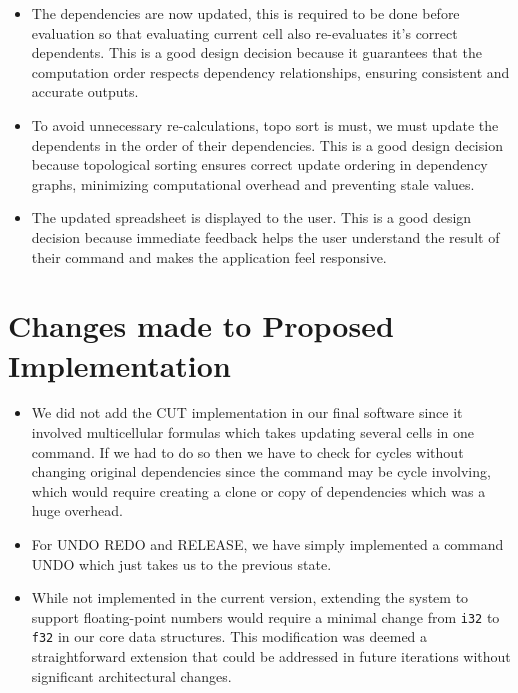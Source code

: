 \documentclass[10pt,a4paper]{article}  %
\begin{document}
\begin{enumerate}
\begin{itemize}
\begin{itemize}
            \item The dependencies are now updated, this is required to be done before evaluation so that evaluating current cell also re-evaluates it's correct dependents.  
            This is a good design decision because it guarantees that the computation order respects dependency relationships, ensuring consistent and accurate outputs.

            \item To avoid unnecessary re-calculations, topo sort is must, we must update the dependents in the order of their dependencies.  
            This is a good design decision because topological sorting ensures correct update ordering in dependency graphs, minimizing computational overhead and preventing stale values.

            \item The updated spreadsheet is displayed to the user.  
            This is a good design decision because immediate feedback helps the user understand the result of their command and makes the application feel responsive.
        \end{itemize}
    \end{itemize}
\end{enumerate}

\section{Changes made to Proposed Implementation}
\begin{itemize}
    \item We did not add the CUT implementation in our final software since it involved multicellular formulas which takes updating several cells in one command. If we had to do so then we have to check for cycles without changing original dependencies since the command may be cycle involving, which would require creating a clone or copy of dependencies which was a huge overhead.
    \item For UNDO REDO and RELEASE, we have simply implemented a command UNDO which just takes us to the previous state.
    \item While not implemented in the current version, extending the system to support floating-point numbers would require a minimal change from \texttt{i32} to \texttt{f32} in our core data structures. This modification was deemed a straightforward extension that could be addressed in future iterations without significant architectural changes.
\end{itemize}
\end{document}
